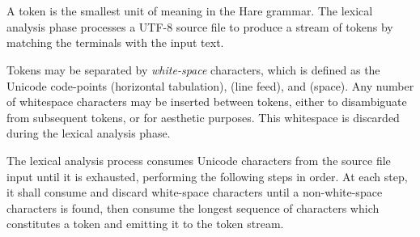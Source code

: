 
\begin{grammar}
\\
	 \\
\end{grammar}

\specsubitem
A token is the smallest unit of meaning in the Hare grammar. The lexical
analysis phase processes a UTF-8 source file to produce a stream of tokens by
matching the terminals with the input text.

\specsubitem
Tokens may be separated by \textit{white-space} characters, which is defined as
the Unicode code-points  (horizontal tabulation), 
(line feed), and  (space). Any number of whitespace characters may
be inserted between tokens, either to disambiguate from subsequent tokens, or
for aesthetic purposes. This whitespace is discarded during the lexical
analysis phase.



\specsubitem
The lexical analysis process consumes Unicode characters from the source file
input until it is exhausted, performing the following steps in order. At each
step, it shall consume and discard white-space characters until a
non-white-space characters is found, then consume the longest sequence of
characters which constitutes a token and emitting it to the token stream.
